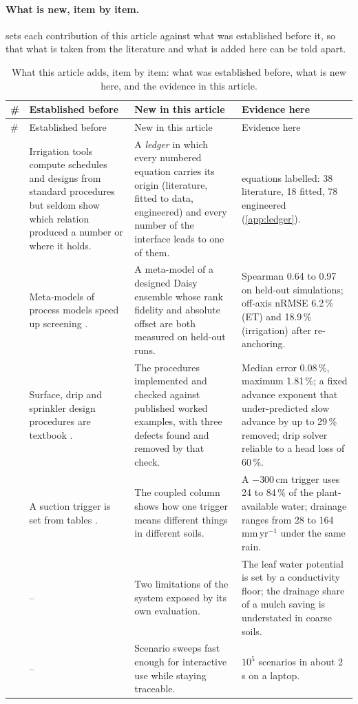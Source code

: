 \documentclass[preprint,12pt]{elsarticle}
\begin{document}
\paragraph{What is new, item by item.}  sets each contribution of this article against what was established before it, so that what is taken from the literature and what is added here can be told apart.
{\small\setlength{\tabcolsep}{4pt}
\begin{longtable}{@{}>{\raggedright\arraybackslash}p{0.4cm}>{\raggedright\arraybackslash}p{4.5cm}>{\raggedright\arraybackslash}p{5.4cm}>{\raggedright\arraybackslash}p{5.0cm}@{}}
\caption{What this article adds, item by item: what was established before, what is new here, and the evidence in this article.}\label{tab:novelty}\\
\toprule
\# & Established before & New in this article & Evidence here\\\midrule\endfirsthead
\toprule \# & Established before & New in this article & Evidence here\\\midrule\endhead
1 & Irrigation tools compute schedules and designs from standard procedures \cite{Allen1998,Steduto2009,Simunek2016} but seldom show which relation produced a number or where it holds. & A \emph{ledger} in which every numbered equation carries its origin (literature, fitted to data, engineered) and every number of the interface leads to one of them. & 134 equations labelled: 38 literature, 18 fitted, 78 engineered (\cref{app:ledger}).\\
2 & Meta-models of process models speed up screening \cite{Razavi2012,Asher2015}. & A meta-model of a designed Daisy ensemble whose rank fidelity and absolute offset are both measured on held-out runs. & Spearman 0.64 to 0.97 on held-out simulations; off-axis nRMSE 6.2\,\% (ET) and 18.9\,\% (irrigation) after re-anchoring.\\
3 & Surface, drip and sprinkler design procedures are textbook \cite{Walker1987,KellerKarmeli1974,Christiansen1942}. & The procedures implemented and checked against published worked examples, with three defects found and removed by that check. & Median error 0.08\,\%, maximum 1.81\,\%; a fixed advance exponent that under-predicted slow advance by up to 29\,\% removed; drip solver reliable to a head loss of 60\,\%.\\
4 & A suction trigger is set from tables \cite{Allen1998}. & The coupled column shows how one trigger means different things in different soils. & A $-300$\,cm trigger uses 24 to 84\,\% of the plant-available water; drainage ranges from 28 to 164\,mm\,yr$^{-1}$ under the same rain.\\
5 & -- & Two limitations of the system exposed by its own evaluation. & The leaf water potential is set by a conductivity floor; the drainage share of a mulch saving is understated in coarse soils.\\
6 & -- & Scenario sweeps fast enough for interactive use while staying traceable. & $10^5$ scenarios in about 2\,s on a laptop.\\
\bottomrule
\end{longtable}}
\end{document}
